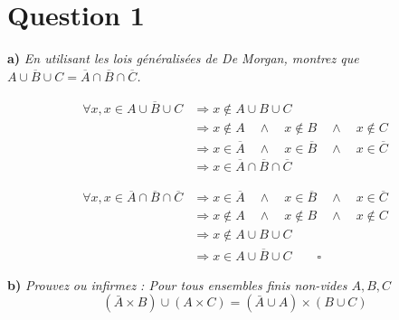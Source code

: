 \section*{Question 1}

\noindent
{\large \textbf{a)}}
\emph{En utilisant les lois généralisées de De Morgan, montrez que \(\overline{A \cup B \cup C} = \overline{A} \cap \overline{B} \cap \overline{C}\).}

\bigskip
\fbox{\(\Rightarrow\)}
\begin{align*}
	\forall x, x \in \overline{A \cup B \cup C} & \Rightarrow x \notin A \cup B \cup C                                                                       \\
	                                            & \Rightarrow x \notin A \quad \wedge \quad x \notin B \quad \wedge \quad x \notin C                         \\
	                                            & \Rightarrow x \in \overline{A} \quad \wedge \quad x \in \overline{B} \quad \wedge \quad x \in \overline{C} \\
	                                            & \Rightarrow x \in \overline{A} \cap \overline{B} \cap \overline{C}
\end{align*}

\bigskip
\fbox{\(\Leftarrow\)}
\begin{align*}
	\forall x, x \in \overline{A} \cap \overline{B} \cap \overline{C} & \Rightarrow x \in \overline{A} \quad \wedge \quad x \in \overline{B} \quad \wedge \quad x \in \overline{C} \\
	                                                                  & \Rightarrow x \notin A \quad \wedge \quad x \notin B \quad \wedge \quad x \notin C                         \\
	                                                                  & \Rightarrow x \notin A \cup B \cup C                                                                       \\
	                                                                  & \Rightarrow x \in \overline{A \cup B \cup C} \qquad \square
\end{align*}

\noindent
{\large \textbf{b)}}
\emph{Prouvez ou infirmez : Pour tous ensembles finis non-vides \(A, B, C\)}
\[(\bar{A} \times B) \cup (A \times C) = (\bar{A} \cup A) \times (B \cup C)\]

